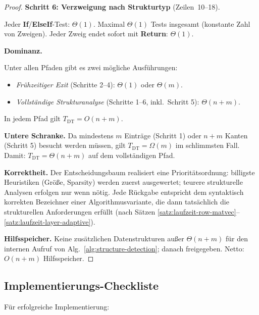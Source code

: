 \documentclass[a4paper,12pt]{report}
\theoremstyle{definition}
\begin{document}
\begin{proof}
		\textbf{Schritt 6: Verzweigung nach Strukturtyp} (Zeilen~10--18).

		Jeder \textbf{If}/\textbf{ElseIf}-Test: $\Theta(1)$. Maximal $\Theta(1)$ Tests insgesamt (konstante Zahl von Zweigen). Jeder Zweig endet sofort mit \textbf{Return}: $\Theta(1)$.

		\textbf{Dominanz.}

		Unter allen Pfaden gibt es zwei mögliche Ausführungen:
		\begin{itemize}
			\item \textit{Frühzeitiger Exit} (Schritte 2--4): $\Theta(1)$ oder $\Theta(m)$.
			\item \textit{Vollständige Strukturanalyse} (Schritte 1--6, inkl.\ Schritt 5): $\Theta(n + m)$.
		\end{itemize}
		In jedem Pfad gilt $T_{\mathrm{DT}} = O(n + m)$.

		\textbf{Untere Schranke.}
		Da mindestens $m$ Einträge (Schritt 1) oder $n + m$ Kanten (Schritt 5) besucht werden müssen, gilt $T_{\mathrm{DT}} = \Omega(m)$ im schlimmsten Fall. Damit: $T_{\mathrm{DT}} = \Theta(n + m)$ auf dem vollständigen Pfad.

		\textbf{Korrektheit.}
		Der Entscheidungsbaum realisiert eine Prioritätsordnung: billigste Heuristiken (Größe, Sparsity) werden zuerst ausgewertet; teurere strukturelle Analysen erfolgen nur wenn nötig. Jede Rückgabe entspricht dem syntaktisch korrekten Bezeichner einer Algorithmusvariante, die dann tatsächlich die strukturellen Anforderungen erfüllt (nach Sätzen \ref{satz:laufzeit-row-matvec}--\ref{satz:laufzeit-layer-adaptive}).

		\textbf{Hilfsspeicher.}
		Keine zusätzlichen Datenstrukturen außer $\Theta(n + m)$ für den internen Aufruf von Alg.~\ref{alg:structure-detection}; danach freigegeben. Netto: $O(n + m)$ Hilfsspeicher.
	\end{proof}

	\subsection{Implementierungs-Checkliste}
	
	Für erfolgreiche Implementierung:
	
\end{document}
